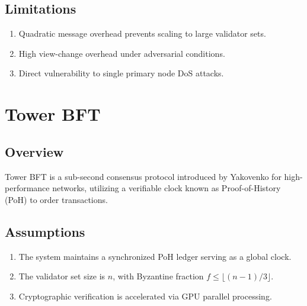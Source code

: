 \documentclass[12pt, oneside, a4paper]{report}
\theoremstyle{definition}
\theoremstyle{remark}
\begin{document}
\subsection{Limitations}
\begin{enumerate}
  \item Quadratic message overhead prevents scaling to large validator sets.
  \item High view-change overhead under adversarial conditions.
  \item Direct vulnerability to single primary node DoS attacks.
\end{enumerate}

\bigskip

\section{Tower BFT}
\label{sec:cm:tower}

\subsection{Overview}
Tower BFT is a sub-second consensus protocol introduced by Yakovenko \cite{yakovenko2018} for high-performance networks, utilizing a verifiable clock known as Proof-of-History (PoH) to order transactions.

\subsection{Assumptions}
\begin{enumerate}
  \item The system maintains a synchronized PoH ledger serving as a global clock.
  \item The validator set size is $n$, with Byzantine fraction $f \le \lfloor (n-1)/3 \rfloor$.
  \item Cryptographic verification is accelerated via GPU parallel processing.
\end{enumerate}
\end{document}
